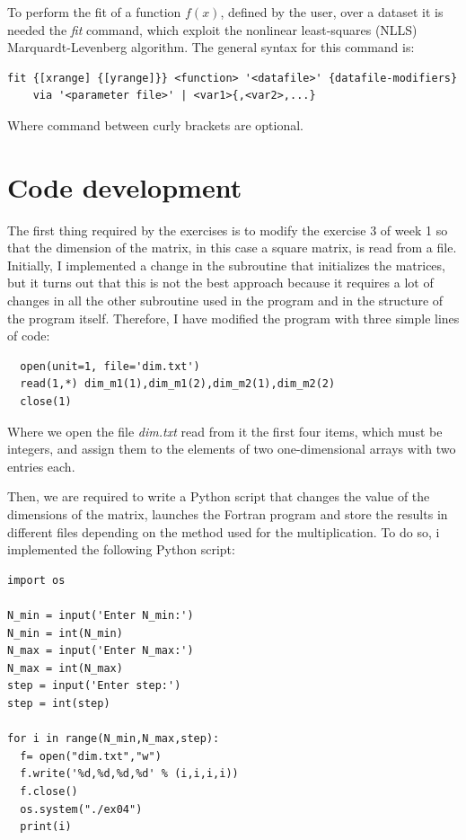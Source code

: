 \documentclass[prb,9pt,notitlepage]{revtex4-1}
\begin{document}
To perform the fit of a function $f(x)$, defined by the user, over a dataset it is needed the \textit{fit} command, which exploit the nonlinear least-squares (NLLS) Marquardt-Levenberg algorithm. The general syntax for this command is:
\begin{lstlisting}
fit {[xrange] {[yrange]}} <function> '<datafile>' {datafile-modifiers}
    via '<parameter file>' | <var1>{,<var2>,...}
\end{lstlisting}
Where command between curly brackets are optional.

\section{Code development}
The first thing required by the exercises is to modify the exercise 3 of week 1 so that the dimension of the matrix, in this case a square matrix, is read from a file. Initially, I implemented a change in the subroutine that initializes the matrices, but it turns out that this is not the best approach because it requires a lot of changes in all the other subroutine used in the program and in the structure of the program itself. Therefore, I have modified the program with three simple lines of code:


\begin{lstlisting}
  open(unit=1, file='dim.txt')
  read(1,*) dim_m1(1),dim_m1(2),dim_m2(1),dim_m2(2)
  close(1)
\end{lstlisting}
Where we open the file \textit{dim.txt} read from it the first four items, which must be integers, and assign them to the elements of two one-dimensional arrays with two entries each.

Then, we are required to write a Python script that changes the value of the dimensions of the matrix, launches the Fortran program and store the results in different files depending on the method used for the multiplication. To do so, i implemented the following Python script:
\begin{lstlisting}
import os

N_min = input('Enter N_min:')
N_min = int(N_min)
N_max = input('Enter N_max:')
N_max = int(N_max)
step = input('Enter step:')
step = int(step)

for i in range(N_min,N_max,step):
  f= open("dim.txt","w")
  f.write('%d,%d,%d,%d' % (i,i,i,i))
  f.close()
  os.system("./ex04")
  print(i)
\end{lstlisting}
\end{document}
